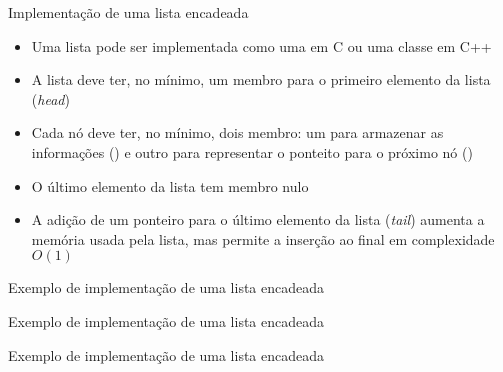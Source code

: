 \begin{frame}[fragile]{Implementação de uma lista encadeada}

    \begin{itemize}
        \item Uma lista pode ser implementada como uma  em C ou uma
            classe em C++

        \item A lista deve ter, no mínimo, um membro para o primeiro elemento da lista
            (\textit{head})

        \item Cada nó deve ter, no mínimo, dois membro: um para armazenar as informações 
            () e outro para representar o ponteito para o próximo nó
            ()

        \item O último elemento da lista tem membro  nulo

        \item A adição de um ponteiro para o último elemento da lista (\textit{tail}) aumenta
            a memória usada pela lista, mas permite a inserção ao final em complexidade $O(1)$
    \end{itemize}

\end{frame}

\begin{frame}[fragile]{Exemplo de implementação de uma lista encadeada}
\end{frame}

\begin{frame}[fragile]{Exemplo de implementação de uma lista encadeada}
\end{frame}

\begin{frame}[fragile]{Exemplo de implementação de uma lista encadeada}
\end{frame}

